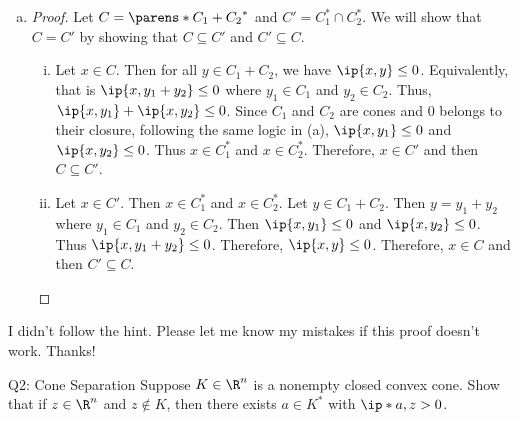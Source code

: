 \documentclass{article}
\theoremstyle{plain}
\theoremstyle{definition}
\theoremstyle{remark}
\begin{document}
\begin{solution}
\begin{enumerate}[(a)]
{\begin{proof}
\begin{enumerate}[(i)]
                    \item {
                        Let $x\in C'$. Then $x\in C_i^*$ for all $i\in I$. Let $y\in \cup_{i\in I}C_i$. Then $y_i\in C_i$ for $i\in I$. Then $\ip{x,y_i}\leq 0$. Thus $\ip{x,y}\leq 0$. Therefore, $x\in C$ and then $C'\subseteq C$.
                    }
                \end{enumerate}
            \end{proof}
        }
        \item {
            \begin{proof}
                Let $C=\parens*{C_1+C_2}^*$ and $C'=C_1^*\cap C_2^*$. We will show that $C=C'$ by showing that $C\subseteq C'$ and $C'\subseteq C$.
                \begin{enumerate}[(i)]
                    \item {
                        Let $x\in C$. Then for all $y\in C_1+C_2$, we have $\ip{x,y}\leq 0$. Equivalently, that is $\ip{x,y_1+y_2}\leq0$ where $y_1\in C_1$ and $y_2\in C_2$. Thus, $\ip{x,y_1}+\ip{x,y_2}\leq 0$. Since $C_1$ and $C_2$ are cones and $0$ belongs to their closure, following the same logic in (a), $\ip{x,y_1}\leq 0$ and $\ip{x,y_2}\leq 0$. Thus $x\in C_1^*$ and $x\in C_2^*$. Therefore, $x\in C'$ and then $C\subseteq C'$.
                    }
                    \item {
                        Let $x\in C'$. Then $x\in C_1^*$ and $x\in C_2^*$. Let $y\in C_1+C_2$. Then $y=y_1+y_2$ where $y_1\in C_1$ and $y_2\in C_2$. Then $\ip{x,y_1}\leq 0$ and $\ip{x,y_2}\leq 0$. Thus $\ip{x,y_1+y_2}\leq 0$. Therefore, $\ip{x,y}\leq 0$. Therefore, $x\in C$ and then $C'\subseteq C$.
                    }
                \end{enumerate}
            \end{proof}
        }
    \end{enumerate}
    I didn't follow the hint. Please let me know my mistakes if this proof doesn't work. Thanks!
\end{solution}

\begin{problem}
    {Q2: Cone Separation}
    Suppose $K\in\R^n$ is a nonempty closed convex cone. Show that if $z\in \R^n$ and $z\notin K$, then there exists $a\in K^*$ with $\ip*{a,z}>0$.
\end{problem}
\end{document}
